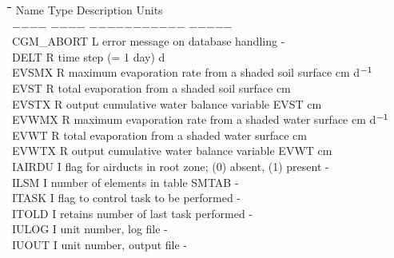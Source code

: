\documentclass[11pt]{article}
\begin{document}
\begin{tabbing}
\hspace{1.27cm}\=\hspace{1.27cm}\=\hspace{1.27cm}\=\hspace{1.27cm}\=%
\hspace{1.27cm}\=\hspace{1.27cm}\=\hspace{1.27cm}\=\hspace{1.27cm}\=%
\hspace{1.27cm}\=\hspace{1.27cm}\=\kill
Name    \> \> Type   \> Description                                        \> \> \> \> \> \> \> Units\\
$-$$-$$-$$-$    \> \> $-$$-$$-$$-$   \> $-$$-$$-$$-$$-$$-$$-$$-$$-$$-$$-$                                        \> \> \> \> \> \> \> $-$$-$$-$$-$$-$\\
CGM\_ABORT\> \> L\> error message on database handling\> \> \> \> \> \> \> -\\
DELT\> \> R\> time step (= 1 day)\> \> \> \> \> \> \> d\\
EVSMX\> \> R\> maximum evaporation rate from a shaded soil surface\> \> \> \> \> \> \> cm d$^{{\rm -1}}$\\
EVST\> \> R\> total evaporation from a shaded soil surface\> \> \> \> \> \> \> cm\\
EVSTX\> \> R\> output cumulative water balance variable EVST\> \> \> \> \> \> \> cm\\
EVWMX\> \> R\> maximum evaporation rate from a shaded water surface\> \> \> \> \> \> \> cm d$^{{\rm -1}}$\\
EVWT\> \> R\> total evaporation from a shaded water surface\> \> \> \> \> \> \> cm\\
EVWTX\> \> R\> output cumulative water balance variable EVWT\> \> \> \> \> \> \> cm\\
IAIRDU\> \> I\> flag for airducts in root zone; (0) absent, (1) present\> \> \> \> \> \> \> -\\
ILSM\> \> I\> number of elements in table SMTAB\> \> \> \> \> \> \> -\\
ITASK\> \> I\> flag to control task to be performed\> \> \> \> \> \> \> -\\
ITOLD\> \> I\> retains number of last task performed\> \> \> \> \> \> \> -\\
IULOG\> \> I\> unit number, log file\> \> \> \> \> \> \> -\\
IUOUT\> \> I\> unit number, output file\> \> \> \> \> \> \> -\\

\end{tabbing}
\end{document}

